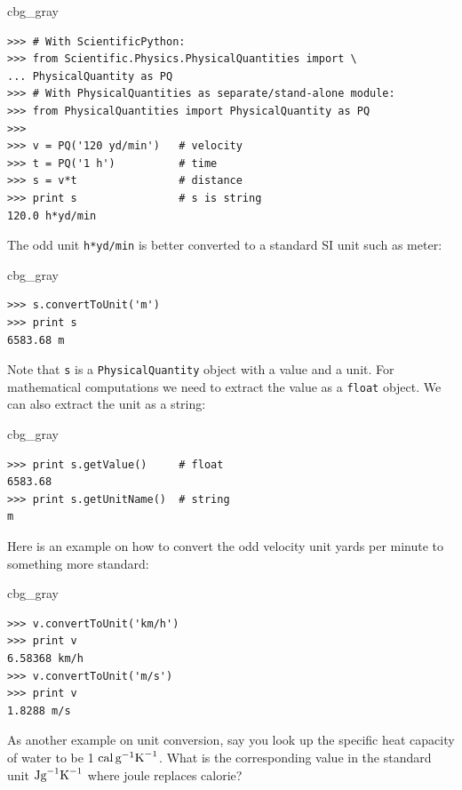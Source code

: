 \documentclass[graybox,envcountchap,sectrefs,final]{svmonodo}
\newenvironment{_cod_tight}[1]{
   \def\FrameCommand{\colorbox{#1}}
   \FrameRule0.6pt\MakeFramed {\FrameRestore}\vskip3mm}
   {\vskip0mm\endMakeFramed}
\newenvironment{cod}[1]{
\bgroup\rmfamily
\fboxsep=0mm\relax
\begin{_cod_tight}{#1}
\list{}{\parsep=-2mm\parskip=0mm\topsep=0pt\leftmargin=2mm
\rightmargin=2\leftmargin\leftmargin=4pt\relax}
\item\relax}
{\endlist\end{_cod_tight}\egroup}
\begin{document}
\begin{cod}{cbg_gray}\begin{Verbatim}[numbers=none,fontsize=\fontsize{9pt}{9pt},baselinestretch=0.95,xleftmargin=2mm]
>>> # With ScientificPython:
>>> from Scientific.Physics.PhysicalQuantities import \ 
... PhysicalQuantity as PQ
>>> # With PhysicalQuantities as separate/stand-alone module:
>>> from PhysicalQuantities import PhysicalQuantity as PQ
>>>
>>> v = PQ('120 yd/min')   # velocity
>>> t = PQ('1 h')          # time
>>> s = v*t                # distance
>>> print s                # s is string
120.0 h*yd/min
\end{Verbatim}
\end{cod}
\noindent
The odd unit \texttt{h*yd/min} is better converted to a standard SI unit such
as meter:

\begin{cod}{cbg_gray}\begin{Verbatim}[numbers=none,fontsize=\fontsize{9pt}{9pt},baselinestretch=0.95,xleftmargin=2mm]
>>> s.convertToUnit('m')
>>> print s
6583.68 m
\end{Verbatim}
\end{cod}
\noindent
Note that \texttt{s} is a \texttt{PhysicalQuantity} object with a value and a
unit. For mathematical computations we need to extract the
value as a \texttt{float} object. We can also extract the unit as a string:

\begin{cod}{cbg_gray}\begin{Verbatim}[numbers=none,fontsize=\fontsize{9pt}{9pt},baselinestretch=0.95,xleftmargin=2mm]
>>> print s.getValue()     # float
6583.68
>>> print s.getUnitName()  # string
m
\end{Verbatim}
\end{cod}
\noindent

Here is an example on how to convert the odd velocity unit yards per
minute to something more standard:

\begin{cod}{cbg_gray}\begin{Verbatim}[numbers=none,fontsize=\fontsize{9pt}{9pt},baselinestretch=0.95,xleftmargin=2mm]
>>> v.convertToUnit('km/h')
>>> print v
6.58368 km/h
>>> v.convertToUnit('m/s')
>>> print v
1.8288 m/s
\end{Verbatim}
\end{cod}
\noindent

As another example on unit conversion,
say you look up the specific heat capacity of water to
be 1 $\hbox{cal}\, \hbox{g}^{-1}\hbox{K}^{-1}$. What is the
corresponding value in the standard unit $\hbox{Jg}^{-1}\hbox{K}^{-1}$
where joule replaces calorie?
\end{document}
